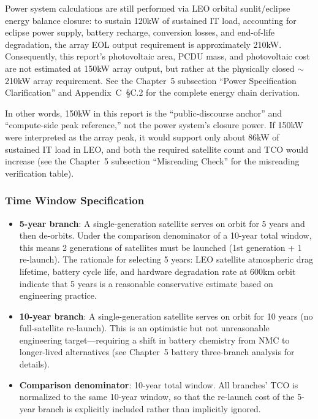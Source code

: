 Power system calculations are still performed via LEO orbital sunlit/eclipse energy balance closure: to sustain 120\;kW of sustained IT load, accounting for eclipse power supply, battery recharge, conversion losses, and end-of-life degradation, the array EOL output requirement is approximately 210\;kW. Consequently, this report's photovoltaic area, PCDU mass, and photovoltaic cost are not estimated at 150\;kW array output, but rather at the physically closed $\sim$210\;kW array requirement. See the Chapter~5 subsection ``Power Specification Clarification'' and Appendix~C~\S C.2 for the complete energy chain derivation.

In other words, 150\;kW in this report is the ``public-discourse anchor'' and ``compute-side peak reference,'' not the power system's closure power. If 150\;kW were interpreted as the array peak, it would support only about 86\;kW of sustained IT load in LEO, and both the required satellite count and TCO would increase (see the Chapter~5 subsection ``Misreading Check'' for the misreading verification table).

\subsubsection{Time Window Specification}

\begin{itemize}[leftmargin=*]
    \item \textbf{5-year branch}: A single-generation satellite serves on orbit for 5 years and then de-orbits. Under the comparison denominator of a 10-year total window, this means 2 generations of satellites must be launched (1st generation + 1 re-launch). The rationale for selecting 5 years: LEO satellite atmospheric drag lifetime, battery cycle life, and hardware degradation rate at 600\;km orbit indicate that 5 years is a reasonable conservative estimate based on engineering practice.
    \item \textbf{10-year branch}: A single-generation satellite serves on orbit for 10 years (no full-satellite re-launch). This is an optimistic but not unreasonable engineering target---requiring a shift in battery chemistry from NMC to longer-lived alternatives (see Chapter~5 battery three-branch analysis for details).
    \item \textbf{Comparison denominator}: 10-year total window. All branches' TCO is normalized to the same 10-year window, so that the re-launch cost of the 5-year branch is explicitly included rather than implicitly ignored.
\end{itemize}

